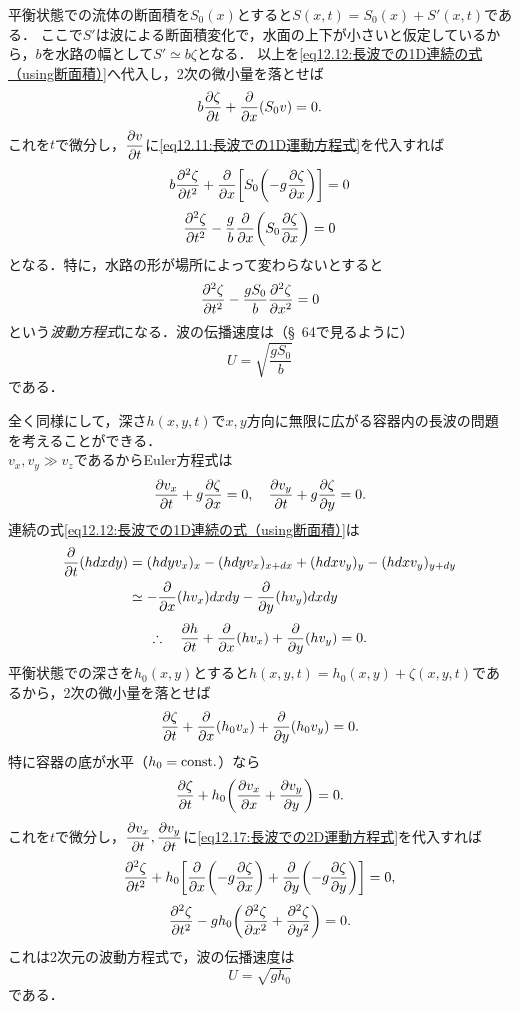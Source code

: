 平衡状態での流体の断面積を$S_0(x)$とすると$S(x,t)=S_0(x)+S'(x,t)$である．
ここで$S'$は波による断面積変化で，水面の上下が小さいと仮定しているから，$b$を水路の幅として$S'\simeq b\zeta$となる．
以上を\eqref{eq12.12:長波での1D連続の式（using断面積）}へ代入し，2次の微小量を落とせば
\begin{equation}
    b \pdv{\zeta}{t} + \pdv{x} (S_0v) =0  .
\end{equation}
これを$t$で微分し，$\dpdv{v}{t}$に\eqref{eq12.11:長波での1D運動方程式}を代入すれば
\[
    b \pdv[2]{\zeta}{t} + \pdv{x}\bqty{ S_0 \pqty{-g\pdv{\zeta}{x}} } =0 
\]
\begin{equation}
    \pdv[2]{\zeta}{t} - \frac{g}{b} \pdv{x}\pqty{ S_0\pdv{\zeta}{x} } =0 
\end{equation}
となる．特に，水路の形が場所によって変わらないとすると
\begin{equation}
    \pdv[2]{\zeta}{t} - \frac{gS_0}{b} \pdv[2]{\zeta}{x} =0 
\end{equation}
という\emph{波動方程式}になる．波の伝播速度は（\S~64で見るように）
\begin{equation}
    U = \sqrt{\frac{gS_0}{b}}
\end{equation}
である．


全く同様にして，深さ$h(x,y,t)$で$x,y$方向に無限に広がる容器内の長波の問題を考えることができる．\\
$v_x,v_y \gg v_z$であるからEuler方程式は
\begin{equation}\label{eq12.17:長波での2D運動方程式}
    \pdv{v_x}{t} +g \pdv{\zeta}{x} = 0, \quad
    \pdv{v_y}{t} +g \pdv{\zeta}{y} = 0 .
\end{equation}
連続の式\eqref{eq12.12:長波での1D連続の式（using断面積）}は
\begin{align*}
    \pdv{t}(hdxdy) &= (hdyv_x)_x - (hdyv_x)_{x+dx} + (hdxv_y)_y - (hdxv_y)_{y+dy} \\
    &\simeq -\pdv{x}(hv_x)dxdy - \pdv{y}(hv_y)dxdy
\end{align*}
\[
    \therefore\quad \pdv{h}{t} + \pdv{x}(hv_x) + \pdv{y}(hv_y) = 0 .
\]
平衡状態での深さを$h_0(x,y)$とすると$h(x,y,t)=h_0(x,y)+\zeta(x,y,t)$であるから，2次の微小量を落とせば
\begin{equation}
    \pdv{\zeta}{t} + \pdv{x}(h_0v_x) + \pdv{y}(h_0v_y) = 0 .
\end{equation}
特に容器の底が水平（$h_0=\mathrm{const.}$）なら
\[
    \pdv{\zeta}{t} + h_0 \pqty{ \pdv{v_x}{x} + \pdv{v_y}{y} }  = 0 .
\]
これを$t$で微分し，$\dpdv{v_x}{t}, \dpdv{v_y}{t}$に\eqref{eq12.17:長波での2D運動方程式}を代入すれば
\[
    \pdv[2]{\zeta}{t} + h_0 \bqty{ \pdv{x}\pqty{ -g\pdv{\zeta}{x} } + \pdv{y}\pqty{ -g\pdv{\zeta}{y} } }  = 0 ,
\]
\begin{equation}
    \pdv[2]{\zeta}{t} - gh_0 \pqty{ \pdv[2]{\zeta}{x} + \pdv[2]{\zeta}{y} }  = 0 .
\end{equation}
これは2次元の波動方程式で，波の伝播速度は
\begin{equation}\label{eq12.20:長波の群速度}
    U = \sqrt{gh_0}
\end{equation}
である．




